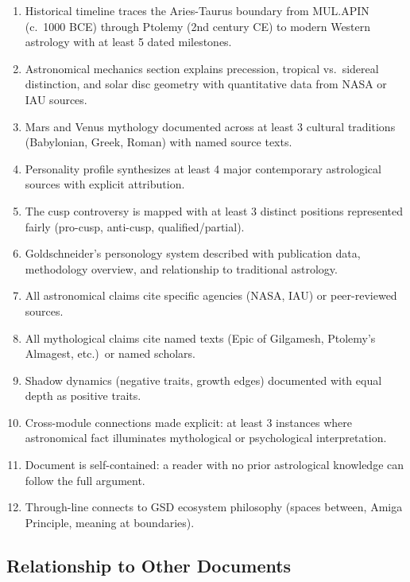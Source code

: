\documentclass[11pt,letterpaper]{article}
\begin{document}
\begin{enumerate}[leftmargin=2em]
\item Historical timeline traces the Aries-Taurus boundary from MUL.APIN (c.\ 1000 BCE) through Ptolemy (2nd century CE) to modern Western astrology with at least 5 dated milestones.
\item Astronomical mechanics section explains precession, tropical vs.\ sidereal distinction, and solar disc geometry with quantitative data from NASA or IAU sources.
\item Mars and Venus mythology documented across at least 3 cultural traditions (Babylonian, Greek, Roman) with named source texts.
\item Personality profile synthesizes at least 4 major contemporary astrological sources with explicit attribution.
\item The cusp controversy is mapped with at least 3 distinct positions represented fairly (pro-cusp, anti-cusp, qualified/partial).
\item Goldschneider's personology system described with publication data, methodology overview, and relationship to traditional astrology.
\item All astronomical claims cite specific agencies (NASA, IAU) or peer-reviewed sources.
\item All mythological claims cite named texts (Epic of Gilgamesh, Ptolemy's Almagest, etc.)\ or named scholars.
\item Shadow dynamics (negative traits, growth edges) documented with equal depth as positive traits.
\item Cross-module connections made explicit: at least 3 instances where astronomical fact illuminates mythological or psychological interpretation.
\item Document is self-contained: a reader with no prior astrological knowledge can follow the full argument.
\item Through-line connects to GSD ecosystem philosophy (spaces between, Amiga Principle, meaning at boundaries).
\end{enumerate}

\subsection{Relationship to Other Documents}
\end{document}
